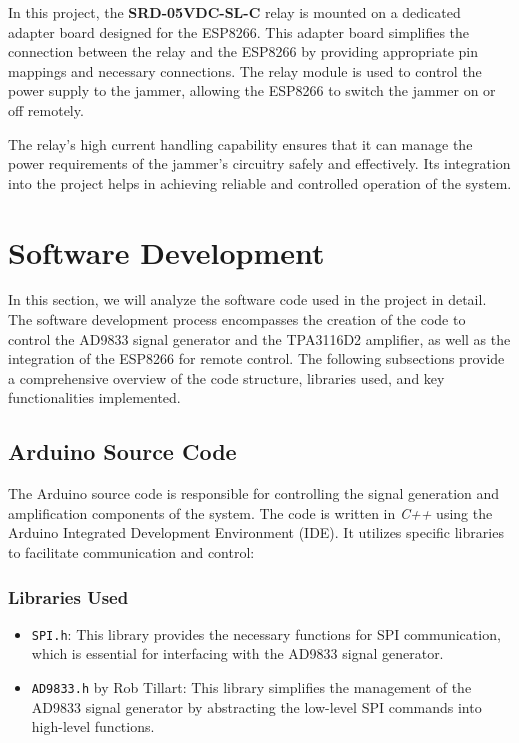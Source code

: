 In this project, the \textbf{SRD-05VDC-SL-C} relay is mounted on a dedicated adapter board designed for the ESP8266. This adapter board simplifies the connection between the relay and the ESP8266 by providing appropriate pin mappings and necessary connections. The relay module is used to control the power supply to the jammer, allowing the ESP8266 to switch the jammer on or off remotely. 

The relay's high current handling capability ensures that it can manage the power requirements of the jammer's circuitry safely and effectively. Its integration into the project helps in achieving reliable and controlled operation of the system.


\section{Software Development}

In this section, we will analyze the software code used in the project in detail. The software development process encompasses the creation of the code to control the AD9833 signal generator and the TPA3116D2 amplifier, as well as the integration of the ESP8266 for remote control. The following subsections provide a comprehensive overview of the code structure, libraries used, and key functionalities implemented.

\subsection{Arduino Source Code}

The Arduino source code is responsible for controlling the signal generation and amplification components of the system. The code is written in \textit{C++} using the Arduino Integrated Development Environment (IDE). It utilizes specific libraries to facilitate communication and control:

\subsubsection{Libraries Used}
\begin{itemize}
    \item \texttt{SPI.h}: This library provides the necessary functions for SPI communication, which is essential for interfacing with the AD9833 signal generator.
    \item \texttt{AD9833.h} by Rob Tillart: This library simplifies the management of the AD9833 signal generator by abstracting the low-level SPI commands into high-level functions.
\end{itemize}

